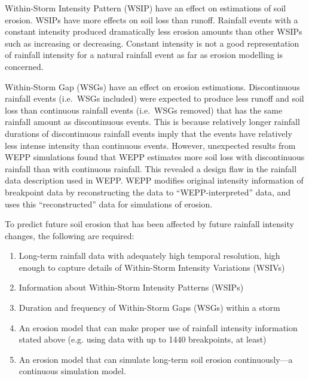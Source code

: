 Within-Storm Intensity Pattern (WSIP) have an effect on estimations of soil
erosion. WSIPs have more effects on soil loss than runoff. Rainfall events with
a constant intensity produced dramatically less erosion amounts than other WSIPs
such as increasing or decreasing. Constant intensity is not a good
representation of rainfall intensity for a natural rainfall event as far as
erosion modelling is concerned.

Within-Storm Gap (WSGs) have an effect on erosion estimations. Discontinuous
rainfall events (i.e.\ WSGs included) were expected to produce less runoff and
soil loss than continuous rainfall events (i.e.\ WSGs removed) that has the same
rainfall amount as discontinuous events. This is because relatively longer
rainfall durations of discontinuous rainfall events imply that the events have
relatively less intense intensity than continuous events. However, unexpected
results from WEPP simulations found that WEPP estimates more soil loss with
discontinuous rainfall than with continuous rainfall. This revealed a design
flaw in the rainfall data description used in WEPP. WEPP modifies original
intensity information of breakpoint data by reconstructing the data to
``WEPP-interpreted'' data, and uses this ``reconstructed'' data for simulations
of erosion.

To predict future soil erosion that has been affected by future rainfall
intensity changes, the following are required:
\begin{enumerate}
  \item Long-term rainfall data with adequately high temporal resolution, high
enough to capture details of Within-Storm Intensity Variations (WSIVs)
  \item Information about Within-Storm Intensity Patterns (WSIPs)
  \item Duration and frequency of Within-Storm Gaps (WSGs) within a storm
  \item An erosion model that can make proper use of rainfall intensity
information stated above (e.g. using data with up to 1440 breakpoints, at
least)
  \item An erosion model that can simulate long-term soil erosion
continuously---a continuous simulation model.
\end{enumerate}

